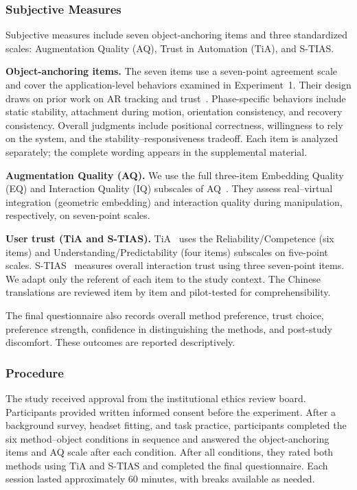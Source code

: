 \documentclass[review]{vgtc}
\begin{document}
\subsubsection{Subjective Measures}

Subjective measures include seven object-anchoring items and three standardized scales: Augmentation Quality (AQ), Trust in Automation (TiA), and S-TIAS.

\textbf{Object-anchoring items.}
The seven items use a seven-point agreement scale and cover the application-level behaviors examined in Experiment~1. Their design draws on prior work on AR tracking and trust~\cite{trustar2024}. Phase-specific behaviors include static stability, attachment during motion, orientation consistency, and recovery consistency. Overall judgments include positional correctness, willingness to rely on the system, and the stability--responsiveness tradeoff. Each item is analyzed separately; the complete wording appears in the supplemental material.

\textbf{Augmentation Quality (AQ).}
We use the full three-item Embedding Quality (EQ) and Interaction Quality (IQ) subscales of AQ~\cite{aq2026}. They assess real--virtual integration (geometric embedding) and interaction quality during manipulation, respectively, on seven-point scales.

\textbf{User trust (TiA and S-TIAS).}
TiA~\cite{tia2019} uses the Reliability/Competence (six items) and Understanding/Predictability (four items) subscales on five-point scales. S-TIAS~\cite{stias2025} measures overall interaction trust using three seven-point items. We adapt only the referent of each item to the study context. The Chinese translations are reviewed item by item and pilot-tested for comprehensibility.

The final questionnaire also records overall method preference, trust choice, preference strength, confidence in distinguishing the methods, and post-study discomfort. These outcomes are reported descriptively.

\subsubsection{Procedure}

The study received approval from the institutional ethics review board. Participants provided written informed consent before the experiment. After a background survey, headset fitting, and task practice, participants completed the six method--object conditions in sequence and answered the object-anchoring items and AQ scale after each condition. After all conditions, they rated both methods using TiA and S-TIAS and completed the final questionnaire. Each session lasted approximately 60 minutes, with breaks available as needed.
\end{document}
